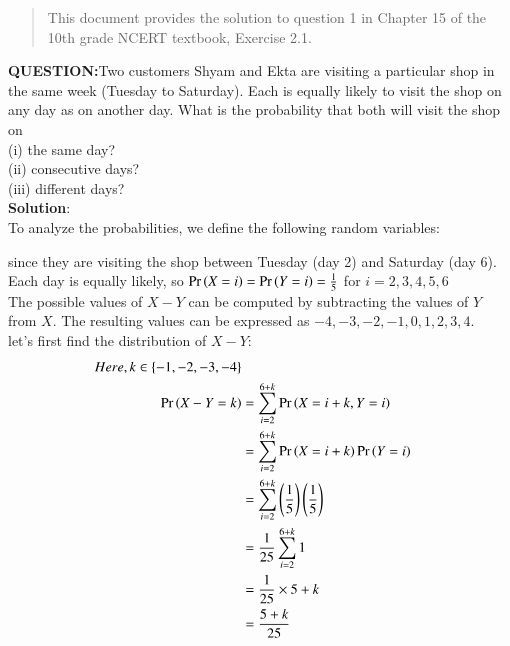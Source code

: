 \documentclass[journal,10pt,twocolumn]{IEEEtran}
\begin{document}
%

\begin{abstract}
This document provides the solution to question 1 in Chapter 15 of the 10th grade NCERT textbook, Exercise 2.1.
\end{abstract}

 \textbf{QUESTION:}Two customers Shyam and Ekta are visiting a particular shop in the same week (Tuesday
to Saturday). Each is equally likely to visit the shop on any day as on another day. What
is the probability that both will visit the shop on \\\noindent (i) the same day? \\\noindent (ii) consecutive
days? \\\noindent (iii) different days?\\
\textbf{Solution}: \\
To analyze the probabilities, we define the following random variables:
\begin{table}[h]
	
\end{table}

since they are visiting the shop between Tuesday (day 2) and Saturday (day 6). Each day is equally likely, so $\Pr\left(X=i\right) = \Pr\left(Y=i\right) = \frac{1}{5}$ for $i=2,3,4,5,6$\\

The possible values of $X - Y$ can be computed by subtracting the values of $Y$ from $X$. The resulting values can be expressed as $-4, -3, -2, -1, 0, 1, 2, 3, 4$.\\

let's first find the distribution of $X - Y$:
\begin{align}
Here,k \in\{-1,-2,-3,-4\} \\
\Pr\left(X - Y = k\right) &= \sum_{i = 2}^{6+k} \Pr\left(X = i+k, Y = i \right) \\
&= \sum_{i = 2}^{6+k} \Pr\left(X = i+k\right) \Pr\left(Y = i\right) \\
&=\sum_{i = 2}^{6+k} \left(\frac{1}{5}\right)\left(\frac{1}{5}\right) \\
&= \frac{1}{25} \sum_{i = 2}^{6+k} 1 \\
&= \frac{1}{25} \times 5+k \\
&= \frac{5+k}{25}
\end{align}
\end{document}
